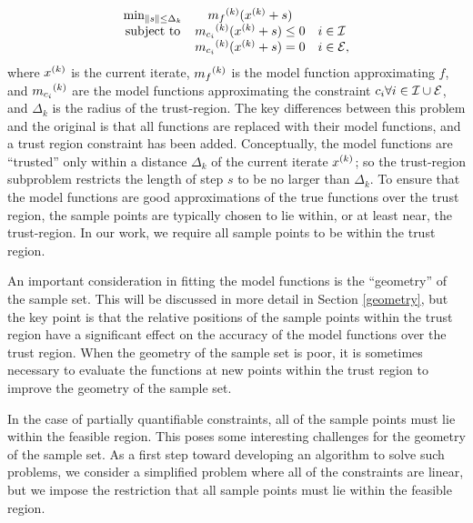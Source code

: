 \[ \begin{array}{ccl} \min_{\| s \| \le \Delta_k}
 & {{m}_f}^{(k)} ({x}^{(k)}+s) \\
\mbox{subject to} & {{m}_{c_i}}^{(k)}({x}^{(k)} + s) \le 0 & i \in \mathcal{I} \\
& {{m}_{c_i}}^{(k)}({x}^{(k)} + s) = 0 & i \in \mathcal{E},
\end{array}
\]
where ${x}^{(k)}$ is the current iterate, ${{m}_f}^{(k)}$ is the model function approximating $f$,  and ${{m}_{c_i}}^{(k)}$ are the model functions approximating the constraint $c_i \forall i \in \mathcal{I} \cup \mathcal{E}$, and $\Delta_k$ is the radius of the trust-region.
The key differences between this problem and the original is that all functions are replaced with their model functions, and a trust region constraint has been added.
Conceptually, the model functions are ``trusted'' only within a distance $\Delta_k$ of the current iterate ${x}^{(k)}$; so the trust-region subproblem restricts the length of step $s$ to be no larger than $\Delta_k$.
To ensure that the model functions are good approximations of the true functions over the trust region, the sample points are typically chosen to lie within, or at least near, the trust-region.
In our work, we require all sample points to be within the trust region.


An important consideration in fitting the model functions is the ``geometry'' of the sample set.
This will be discussed in more detail in Section \cref{geometry}, but the key point is that the relative positions of the sample points within the trust region have a significant effect on the accuracy of the model functions over the trust region.
When the geometry of the sample set is poor, it is sometimes necessary to evaluate the functions at new points within the trust region to improve the geometry of the sample set.

In the case of partially quantifiable constraints, all of the sample points must lie within the feasible region.
This poses some interesting challenges for the geometry of the sample set.
As a first step toward developing an algorithm to solve such problems, we consider a simplified problem where all of the constraints are linear, but we impose the restriction that all sample points must lie within the feasible region.

  

